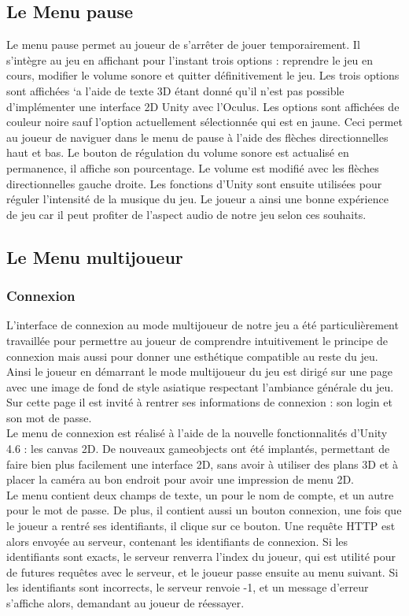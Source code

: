 \documentclass[12pt]{article}
\begin{document}
\subsection{Le Menu pause}

Le menu pause permet au joueur de s’arrêter de jouer temporairement. Il s’intègre au jeu en affichant pour l’instant trois options : reprendre le jeu en cours, modifier le volume sonore et quitter définitivement le jeu. Les trois options sont affichées `a l’aide de texte 3D étant donné qu’il n’est pas possible d’implémenter une interface 2D Unity avec l’Oculus. Les options sont affichées de couleur noire sauf l’option actuellement sélectionnée qui est en jaune. Ceci permet au joueur de naviguer dans le menu de pause à l’aide des flèches directionnelles haut et bas. Le bouton de régulation du volume sonore est actualisé en permanence, il affiche son pourcentage. Le volume est modifié avec les flèches directionnelles gauche droite. Les fonctions d’Unity sont ensuite utilisées pour réguler l’intensité de la musique du jeu. Le joueur a ainsi une bonne expérience de jeu car il peut profiter de l’aspect audio de notre jeu selon ces souhaits.

\subsection{Le Menu multijoueur}

\subsubsection{Connexion}

L’interface de connexion au mode multijoueur de notre jeu a été particulièrement travaillée pour permettre au joueur de comprendre intuitivement le principe de connexion mais aussi pour donner une esthétique compatible au reste du jeu. Ainsi le joueur en démarrant le mode multijoueur du jeu est dirigé sur une page avec une image de fond de style asiatique respectant l’ambiance générale du jeu. Sur cette page il est invité à rentrer ses informations de connexion : son login et son mot de passe. \\

Le menu de connexion est réalisé à l'aide de la nouvelle fonctionnalités d'Unity 4.6 : les canvas 2D. De nouveaux gameobjects ont été implantés, permettant de faire bien plus facilement une interface 2D, sans avoir à utiliser des plans 3D et à placer la caméra au bon endroit pour avoir une impression de menu 2D.\\
Le menu contient deux champs de texte, un pour le nom de compte, et un autre pour le mot de passe. De plus, il contient aussi un bouton connexion, une fois que le joueur a rentré ses identifiants, il clique sur ce bouton. Une requête HTTP est alors envoyée au serveur, contenant les identifiants de connexion. Si les identifiants sont exacts, le serveur renverra l'index du joueur, qui est utilité pour de futures requêtes avec le serveur, et le joueur passe ensuite au menu suivant. Si les identifiants sont incorrects, le serveur renvoie -1, et un message d'erreur s'affiche alors, demandant au joueur de réessayer.\\
\end{document}
